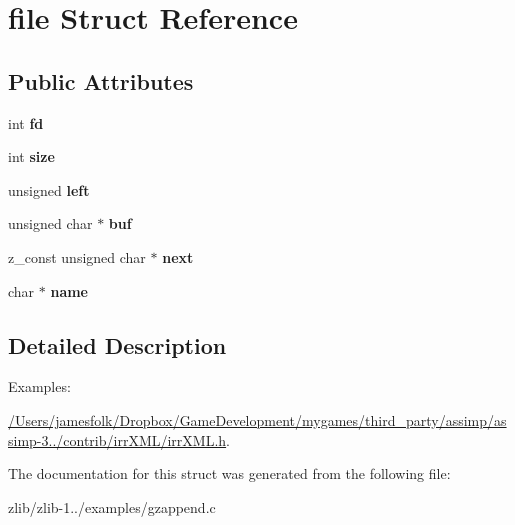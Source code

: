 \hypertarget{structfile}{\section{file Struct Reference}
\label{structfile}
}
\subsection*{Public Attributes}
\begin{DoxyCompactItemize}
\item 
\hypertarget{structfile_abcdc3058fcb2b789cd4ce5f62f274363}{int {\bfseries fd}}\label{structfile_abcdc3058fcb2b789cd4ce5f62f274363}

\item 
\hypertarget{structfile_a83a90719edeee627bd6fefe5f8af58ce}{int {\bfseries size}}\label{structfile_a83a90719edeee627bd6fefe5f8af58ce}

\item 
\hypertarget{structfile_a1daada626c3f3cb05e53c452005bf85c}{unsigned {\bfseries left}}\label{structfile_a1daada626c3f3cb05e53c452005bf85c}

\item 
\hypertarget{structfile_a30a7682edfcbc02f96fc4ed9eb1bc2a2}{unsigned char $\ast$ {\bfseries buf}}\label{structfile_a30a7682edfcbc02f96fc4ed9eb1bc2a2}

\item 
\hypertarget{structfile_ab23500cb0d30eec43ca8edb358660bd2}{z\+\_\+const unsigned char $\ast$ {\bfseries next}}\label{structfile_ab23500cb0d30eec43ca8edb358660bd2}

\item 
\hypertarget{structfile_a93164d6663f12c00df3d65b7b0990cc2}{char $\ast$ {\bfseries name}}\label{structfile_a93164d6663f12c00df3d65b7b0990cc2}

\end{DoxyCompactItemize}


\subsection{Detailed Description}
\begin{Desc}
\item[Examples\+: ]\par
\hyperlink{_2_users_2jamesfolk_2_dropbox_2_game_development_2mygames_2third_party_2assimp_2assimp-3_81_81_2b1dcc9df1e93e2ac9c863740ad4632a8}{/\+Users/jamesfolk/\+Dropbox/\+Game\+Development/mygames/third\+\_\+party/assimp/assimp-\/3../contrib/irr\+X\+M\+L/irr\+X\+M\+L.\+h}.\end{Desc}


The documentation for this struct was generated from the following file\+:\begin{DoxyCompactItemize}
\item 
zlib/zlib-\/1../examples/gzappend.\+c\end{DoxyCompactItemize}
